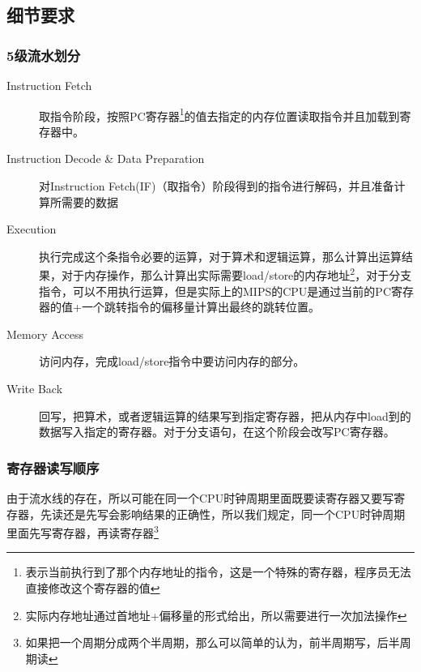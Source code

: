 \documentclass[a4paper, 11pt]{article}
\begin{document}
\subsection{细节要求}
\subsubsection{5级流水划分}
	\begin{description}
		\item[Instruction Fetch] 取指令阶段，按照PC寄存器\footnote{表示当前执行到了那个内存地址的指令，这是一个特殊的寄存器，程序员无法直接修改这个寄存器的值}的值去指定的内存位置读取指令并且加载到寄存器中。
		\item[Instruction Decode \& Data Preparation] 对Instruction Fetch(IF)（取指令）阶段得到的指令进行解码，并且准备计算所需要的数据
		\item[Execution] 执行完成这个条指令必要的运算，对于算术和逻辑运算，那么计算出运算结果，对于内存操作，那么计算出实际需要load/store的内存地址\footnote{实际内存地址通过首地址+偏移量的形式给出，所以需要进行一次加法操作}，对于分支指令，可以不用执行运算，但是实际上的MIPS的CPU是通过当前的PC寄存器的值+一个跳转指令的偏移量计算出最终的跳转位置。
		\item[Memory Access] 访问内存，完成load/store指令中要访问内存的部分。
		\item[Write Back] 回写，把算术，或者逻辑运算的结果写到指定寄存器，把从内存中load到的数据写入指定的寄存器。对于分支语句，在这个阶段会改写PC寄存器。
	\end{description}
\subsubsection{寄存器读写顺序}
	由于流水线的存在，所以可能在同一个CPU时钟周期里面既要读寄存器又要写寄存器，先读还是先写会影响结果的正确性，所以我们规定，同一个CPU时钟周期里面先写寄存器，再读寄存器\footnote{如果把一个周期分成两个半周期，那么可以简单的认为，前半周期写，后半周期读}
\end{document}
